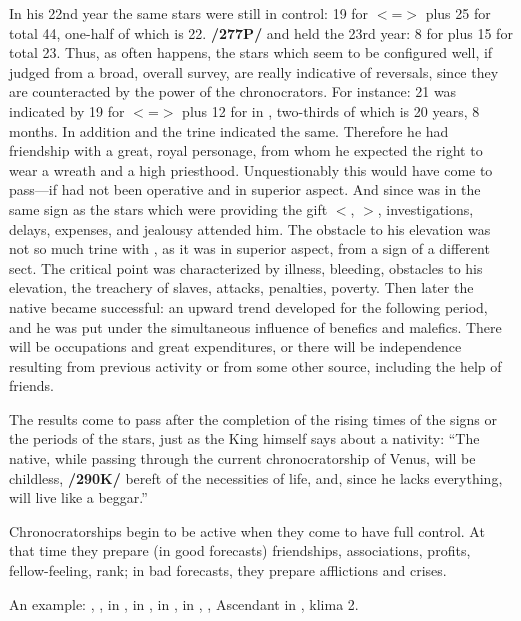 In his 22nd year the same stars were still in control: 19 for \Leo\xspace $<$=\Sun$>$ plus 25 for \Taurus\xspace total 44, one-half of which is 22. \textbf{/277P/} \Venus\xspace and \Mars\xspace held the 23rd year: 8 for \Venus\xspace plus 15 for \Mars\xspace total 23. Thus, as often happens, the stars which seem to be configured well, if judged from a broad, overall survey, are really indicative of reversals, since they are counteracted by the power of the chronocrators. For instance: 21 was indicated by 19 for \Leo\xspace $<$=\Sun$>$ plus 12 for \Jupiter\xspace in \Leo, two-thirds of which is 20 years, 8 months. In addition \Jupiter\xspace and the \Sun\xspace trine indicated the same. Therefore he had friendship with a great, royal personage, from whom he expected the right to wear a wreath and a high priesthood. Unquestionably this would have come to pass—if \Mars\xspace had not been operative and in superior aspect. And since \Saturn\xspace was in the same sign as the stars which were providing the gift $<$\Sun, \Mercury$>$, investigations, delays, expenses, and jealousy attended him. The obstacle to his elevation was not so much \Saturn\xspace trine with \Jupiter, as it was \Mars\xspace in superior aspect, from a sign of a different sect. The critical point was characterized by illness, bleeding, obstacles to his elevation, the treachery of slaves, attacks, penalties, poverty. Then later the native became successful: an upward trend developed for the
following period, and he was put under the simultaneous influence of benefics and malefics. There will be occupations and great expenditures, or there will be independence resulting from previous activity or from some other source, including the help of friends.

The results come to pass after the completion of the rising times of the signs or the periods of the stars, just as the King himself says about a nativity: “The native, while passing through the current
chronocratorship of Venus, will be childless, \textbf{/290K/} bereft of the necessities of life, and, since he lacks everything, will live like a beggar.” 

Chronocratorships begin to be active when they come to have full
control. At that time they prepare (in good forecasts) friendships, associations, profits, fellow-feeling, rank; in bad forecasts, they prepare afflictions and crises.

An example: \Sun, \Jupiter, \Mercury\xspace in \Libra, \Moon\xspace in \Taurus, \Saturn\xspace in \Cancer, \Mars\xspace in \Sagittarius,
\Venus, Ascendant in \Scorpio, klima 2. 

